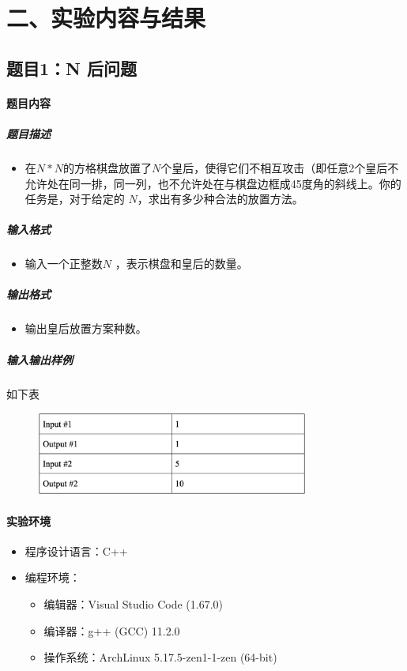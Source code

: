 \documentclass[12pt,a4paper]{ctexart}
\begin{document}
\vspace{5pt}

\section*{二、实验内容与结果}
\subsection*{题目1：N 后问题}
\paragraph{题目内容}
\subparagraph{题目描述}
\begin{itemize}
    \item 在$N*N$的方格棋盘放置了$N$个皇后，使得它们不相互攻击（即任意2个皇后不允许处在同一排，同一列，也不允许处在与棋盘边框成45度角的斜线上。你的任务是，对于给定的 $N$，求出有多少种合法的放置方法。
\end{itemize}


\subparagraph{输入格式}
    \begin{itemize}
        \item 输入一个正整数$N$ ，表示棋盘和皇后的数量。
    \end{itemize}
\subparagraph{输出格式}
    \begin{itemize}
        \item 输出皇后放置方案种数。
    \end{itemize}

\subparagraph{输入输出样例}
如下表
    \begin{figure}[h]
        \centering
        \includegraphics[width=0.80\textwidth]{q1_iodata.png}
    \end{figure}

\vspace{5pt}

\paragraph{实验环境}
\begin{itemize}
    \item 程序设计语言：C++
    \item 编程环境：
    \begin{itemize}
        \item 编辑器：Visual Studio Code (1.67.0)
        \item 编译器：g++ (GCC) 11.2.0
        \item 操作系统：ArchLinux 5.17.5-zen1-1-zen (64-bit)
    \end{itemize}
\end{itemize}
\end{document}
